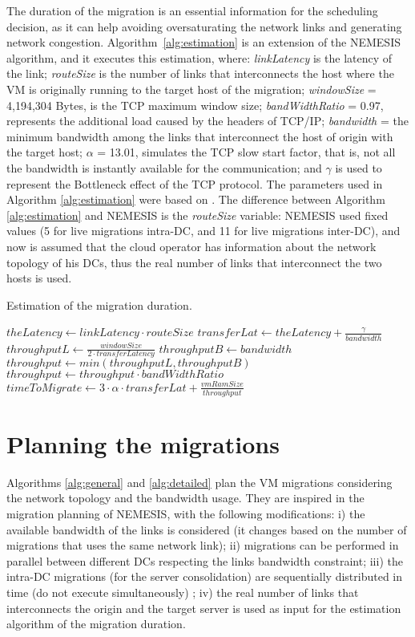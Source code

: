 The duration of the migration is an essential information for the scheduling decision, as it can help avoiding oversaturating the network links and generating network congestion. Algorithm~\ref{alg:estimation} is an extension of the NEMESIS algorithm, and it executes this estimation, where: \textit{linkLatency} is the latency of the link; \textit{routeSize} is the number of links that interconnects the host where the VM is originally running to the target host of the migration; \mbox{\textit{windowSize}} = 4,194,304 Bytes, is the TCP maximum window size; \textit{bandWidthRatio} = 0.97, represents the additional load caused by the headers of TCP/IP; \textit{bandwidth} = the minimum bandwidth among the links that interconnect the host of origin with the target host; $\alpha$ = 13.01, simulates the TCP slow start factor, that is, not all the bandwidth is instantly available for the communication; and $\gamma$ is used to represent the Bottleneck effect of the TCP protocol.  The parameters used in Algorithm \ref{alg:estimation} were based on \cite{velho2013simgridparameters}. The difference between Algorithm \ref{alg:estimation}  and NEMESIS is the \textit{routeSize} variable: NEMESIS used fixed values (5 for live migrations intra-DC, and 11 for live migrations inter-DC), and now is assumed that the cloud operator has information about the network topology of his DCs, thus the real number of links that interconnect the two hosts is used.

\begin{algorithm}
\begin{algorithmic}
\caption{Estimation of the migration duration.}\label{alg:estimation}
\State $theLatency \gets linkLatency \cdot routeSize$
\State $transferLat \gets theLatency + \frac{\gamma}{bandwidth}$
\State $throughputL \gets \frac{windowSize}{2 \cdot transferLatency}$
\State $throughputB \gets bandwidth$
\State $throughput \gets min(throughputL, throughputB)$
\State $throughput \gets throughput 
\cdot bandWidthRatio$
\State $timeToMigrate \gets  3 \cdot \alpha \cdot transferLat + \frac{vmRamSize}{throughput}$ 
\end{algorithmic}
\end{algorithm}

\section{Planning the migrations}
\label{sec:modeling_smargreens}

Algorithms \ref{alg:general} and \ref{alg:detailed} plan the VM migrations considering the network topology and the bandwidth usage. They are inspired in the migration planning of NEMESIS, with the following modifications: i) the available bandwidth of the links is considered (it changes based on the number of migrations that uses the same network link); ii) migrations can be performed in parallel between different DCs respecting the links bandwidth constraint; iii) the intra-DC migrations (for the server consolidation) are sequentially distributed in time (do not execute simultaneously) ; iv) the real number of links that interconnects the origin and the target server is used as input for the estimation algorithm of the migration duration. 

